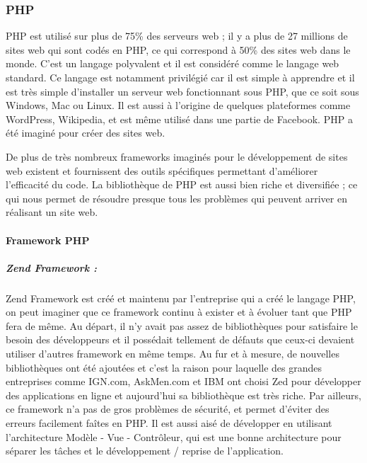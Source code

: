         \subsubsection{PHP}
        \label{subsubsec:php}
        PHP est utilisé sur plus de 75\% des serveurs web ; il y a plus de 27 millions de sites web qui
        sont codés en PHP, ce qui correspond à 50\% des sites web dans le monde. C’est un langage
        polyvalent et il est considéré comme le langage web standard. Ce langage est notamment privilégié
        car il est simple à apprendre et il est très simple d’installer un serveur web fonctionnant sous PHP,
        que ce soit sous Windows, Mac ou Linux. Il est aussi à l’origine de quelques plateformes comme
        WordPress, Wikipedia, et est même utilisé dans une partie de Facebook. PHP a été imaginé pour
        créer des sites web.

        De plus de très nombreux frameworks imaginés pour le développement de sites web existent
        et fournissent des outils spécifiques permettant d’améliorer l’efficacité du code. La bibliothèque de
        PHP est aussi bien riche et diversifiée ; ce qui nous permet de résoudre presque tous les problèmes
        qui peuvent arriver en réalisant un site web.

        \paragraph{Framework PHP}
        \label{par:framworkPHP}

            \subparagraph{Zend Framework :}
            \label{subpar:zend}
            Zend Framework est créé et maintenu par l'entreprise qui a créé le langage PHP, on peut imaginer
            que ce framework continu à exister et à évoluer tant que PHP fera de même. Au départ, il n'y avait
            pas assez de bibliothèques pour satisfaire le besoin des développeurs et il possédait tellement
            de défauts que ceux-ci devaient utiliser d’autres framework en même temps. Au fur et à mesure,
            de nouvelles bibliothèques ont été ajoutées et c'est la raison pour laquelle des grandes entreprises comme IGN.com,
            AskMen.com et IBM ont choisi Zed pour développer des applications en ligne et aujourd’hui  sa bibliothèque
            est très riche. Par ailleurs, ce framework n’a pas de gros problèmes de sécurité, et permet d’éviter
            des erreurs facilement faîtes en PHP. Il est aussi aisé de développer en utilisant l’architecture
            Modèle - Vue - Contrôleur, qui est une bonne architecture pour séparer les tâches et
            le développement / reprise de l’application.


